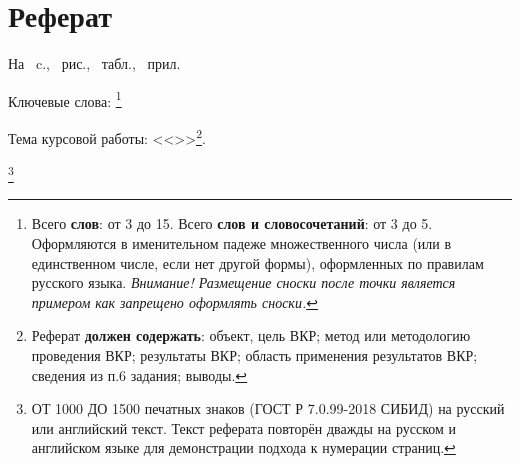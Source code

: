 \chapter*[Count-me]{Реферат} %
\thispagestyle{empty}%
%
%




На ~c.,  
~{рис.},
~{табл.},
~{прил.}%



{Ключевые слова: \keywordsRu}\footnote{Всего \textbf{слов}: от 3 до 15. Всего \textbf{слов и словосочетаний}: от 3 до 5. Оформляются в именительном падеже множественного числа (или в единственном числе, если нет другой формы), оформленных по правилам русского языка. \textit{Внимание! Размещение сноски после точки является примером как запрещено оформлять сноски.}} %

Тема курсовой работы: <<\thesisTitle>>\footnote{Реферат \textbf{должен содержать}: объект, цель ВКР; метод или методологию проведения ВКР; результаты ВКР; область применения результатов ВКР; сведения из п.6 задания; выводы.}. %


\abstractRu\footnote{ОТ 1000 ДО 1500 печатных знаков (ГОСТ Р 7.0.99-2018 СИБИД) на русский или английский текст. Текст реферата повторён дважды на русском и английском языке для демонстрации подхода к нумерации страниц.} %

